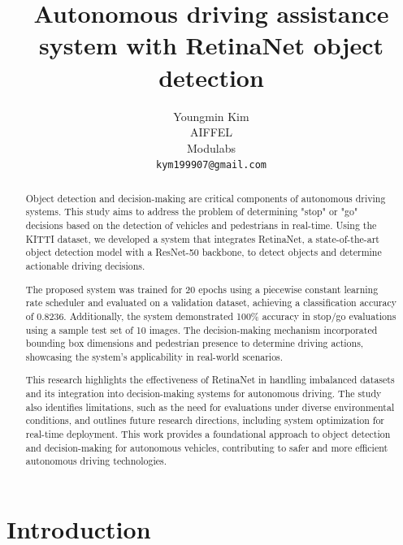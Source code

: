 \documentclass[10pt,twocolumn,letterpaper]{article}
\begin{document}
\title{Autonomous driving assistance system with RetinaNet object detection}

\author{Youngmin Kim\\
AIFFEL\\
Modulabs\\
{\tt\small kym199907@gmail.com}
}
\maketitle

\begin{abstract}
Object detection and decision-making are critical components of autonomous driving systems. This study aims to address the problem of determining "stop" or "go" decisions based on the detection of vehicles and pedestrians in real-time. Using the KITTI dataset, we developed a system that integrates RetinaNet, a state-of-the-art object detection model with a ResNet-50 backbone, to detect objects and determine actionable driving decisions.

The proposed system was trained for 20 epochs using a piecewise constant learning rate scheduler and evaluated on a validation dataset, achieving a classification accuracy of 0.8236. Additionally, the system demonstrated 100\% accuracy in stop/go evaluations using a sample test set of 10 images. The decision-making mechanism incorporated bounding box dimensions and pedestrian presence to determine driving actions, showcasing the system's applicability in real-world scenarios.

This research highlights the effectiveness of RetinaNet in handling imbalanced datasets and its integration into decision-making systems for autonomous driving. The study also identifies limitations, such as the need for evaluations under diverse environmental conditions, and outlines future research directions, including system optimization for real-time deployment. This work provides a foundational approach to object detection and decision-making for autonomous vehicles, contributing to safer and more efficient autonomous driving technologies.
\end{abstract}


\section{Introduction}
\end{document}
